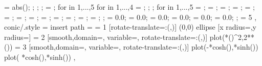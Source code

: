 {{{{{{{              \cs@max = abs(\cs@tangents{\cs@i,\cs@j});
            };
          };
        };
        \cs@max = ;
        for \cs@i in {1,...,5} {
          for \cs@j in {1,...,4} {
            \cs@tangents{\cs@i,\cs@j} = \fpeval{\cs@tangents{\cs@i,\cs@j} / \cs@max};
          };
        };
        for \cs@i in {1,...,5} {
          \cs@u = ;
          \cs@v = ;
          \cs@w = ;
          \cs@temp = ;
          \cs@u = \fpeval{\cs@u / \cs@temp};
          \cs@v = \fpeval{\cs@v / \cs@temp};
          \cs@w = \fpeval{\cs@w / \cs@temp};
           = ;
           = \fpeval{\cs@u*\cs@v};
           = ;
           = \fpeval{\cs@u*\cs@w};
           = \fpeval{\cs@v*\cs@w};
           = ;
        };
         = 0.0;  = 0.0;  = 0.0; 
         = 0.0;  = 0.0;  = 0.0; 
      };
    }
    \ifnum \cs@TanCnt = 5
    \fi
  },
  conic/.style = {
    insert path = {
      \ifnum \cs@type = 1 %
        [rotate-translate={\cs@angle:(\cs@xshift,\cs@yshift)}]
        (0,0) ellipse [x radius=\cs@a,y radius=\cs@b]
      \else\ifnum \cs@type = 2%
        [smooth,domain=,
        variable=\euclidea@var,
        rotate-translate={\cs@angle:(\cs@xshift,\cs@yshift)}]
        plot({\cs@a*(\euclidea@var)^2},{2*\cs@a*(\euclidea@var)}) 
      \else\ifnum \cs@type = 3%
        [smooth,domain=,
        variable=\euclidea@var,
        rotate-translate={\cs@angle:(\cs@xshift,\cs@yshift)}]
        plot({-\cs@a*cosh(\euclidea@var)},{\cs@b*sinh(\euclidea@var)})  %
        plot({ \cs@a*cosh(\euclidea@var)},{\cs@b*sinh(\euclidea@var)})  %
      \fi\fi\fi
    }
  },
}

